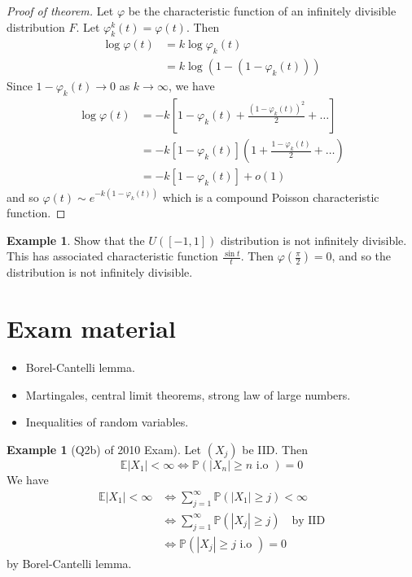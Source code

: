 \documentclass[10pt, oneside, reqno]{amsart}
\theoremstyle{plain}%
\theoremstyle{definition}
\newtheorem{exmp}[thm]{Example}
\theoremstyle{remark}
\renewcommand{\phi}{\varphi}
\newcommand{\E}{\mathbb{E}}
\renewcommand{\P}{\mathbb{P}}
\begin{document}
\begin{proof}[Proof of theorem]
    Let $\phi$ be the characteristic function of an infinitely divisible distribution $F$.  Let $\phi_k^k(t) = \phi(t)$.  Then \begin{align*}
        \log \phi(t)    &= k \log \phi_k(t) \\
                        &= k \log ( 1 - (1 - \phi_k(t))) 
    \end{align*}
  Since $ 1 - \phi_k(t) \rightarrow 0$ as $ k \rightarrow \infty$, we have \begin{align*}
        \log \phi(t) &= -k [ 1 - \phi_k(t) + \frac{\left( 1 - \phi_k(t) \right)^2}{2} + \dots] \\
            &= - k[1 - \phi_k(t)]( 1 + \frac{1 - \phi_k(t)}{2} + \dots) \\
            &=  - k[1 - \phi_k(t)] + o(1)
    \end{align*} and so $\phi(t) \sim e^{-k( 1 - \phi_k(t))}$ which is a compound Poisson characteristic function. 
\end{proof}

\begin{exmp}
    Show that the $U([-1, 1])$ distribution is not infinitely divisible.  This has associated characteristic function $\frac{\sin t}{t}$.  Then $\phi(\frac{\pi}{2}) = 0$, and so the distribution is not infinitely divisible.
\end{exmp}

\section{Exam material} %
\label{sec:exam_material}
\begin{itemize}
    \item Borel-Cantelli lemma.
    \item Martingales, central limit theorems, strong law of large numbers.
    \item Inequalities of random variables.
\end{itemize}

\begin{exmp}[Q2b) of 2010 Exam]
    Let $(X_j)$ be IID.  Then \[
        \E|X_1| < \infty \iff \P(|X_n| \geq n \text{ i.o }) = 0 
    \]  We have \begin{align*}
        \E|X_1| < \infty &\iff \sum_{j=1}^\infty \P(|X_1| \geq j) < \infty \\
                &\iff \sum_{j=1}^\infty \P(|X_j| \geq j) \quad \text{by IID} \\
                &\iff \P(|X_j| \geq j \text{ i.o }) = 0
    \end{align*} by Borel-Cantelli lemma.
\end{exmp}
\end{document}
